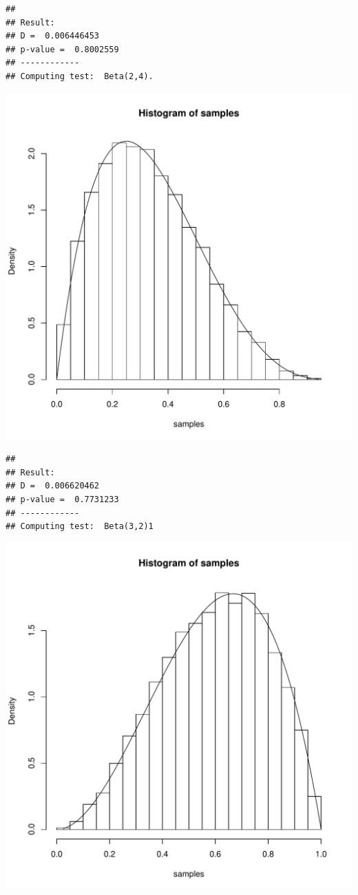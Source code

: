 \documentclass{llncs}\usepackage[]{graphicx}\usepackage[]{color}
\makeatletter
\def\maxwidth{ %
  \ifdim\Gin@nat@width>\linewidth
    \linewidth
  \else
    \Gin@nat@width
  \fi
}
\newenvironment{kframe}{%
 \def\at@end@of@kframe{}%
 \ifinner\ifhmode%
  \def\at@end@of@kframe{\end{minipage}}%
  \begin{minipage}{\columnwidth}%
 \fi\fi%
 \def\FrameCommand##1{\hskip\@totalleftmargin \hskip-\fboxsep
 \colorbox{shadecolor}{##1}\hskip-\fboxsep
     \hskip-\linewidth \hskip-\@totalleftmargin \hskip\columnwidth}%
 \MakeFramed {\advance\hsize-\width
   \@totalleftmargin\z@ \linewidth\hsize
   \@setminipage}}%
 {\par\unskip\endMakeFramed%
 \at@end@of@kframe}
\newenvironment{knitrout}{}{} %
\makeatother
\begin{document}
\begin{knitrout}
\begin{kframe}\begin{lstlisting}[basicstyle=\ttfamily,breaklines=true]
## 
## Result:
## D =  0.006446453 
## p-value =  0.8002559 
## ------------
## Computing test:  Beta(2,4).
\end{lstlisting}
\end{kframe}
\includegraphics[width=\maxwidth]{figure/Rt-4} 
\begin{kframe}\begin{lstlisting}[basicstyle=\ttfamily,breaklines=true]
## 
## Result:
## D =  0.006620462 
## p-value =  0.7731233 
## ------------
## Computing test:  Beta(3,2)1
\end{lstlisting}
\end{kframe}
\includegraphics[width=\maxwidth]{figure/Rt-5} 

\end{knitrout}
\end{document}
